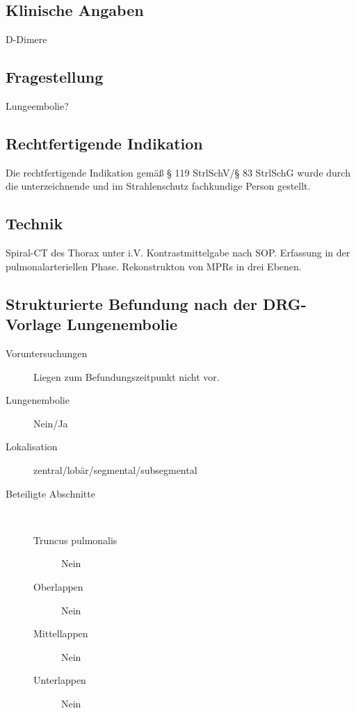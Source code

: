 \documentclass{scrartcl}
\begin{document}
\begin{letter}{\addressee{}}
  \opening{}

  \subsection*{Klinische Angaben}
  \begin{description}
  \item[D-Dimere]
  \end{description}

  \subsection*{Fragestellung}
  Lungeembolie?

  \subsection*{Rechtfertigende Indikation}
  Die rechtfertigende Indikation gemäß § 119 StrlSchV/§ 83 StrlSchG wurde durch die unterzeichnende und im Strahlenschutz fachkundige Person gestellt.

  \subsection*{Technik}
  Spiral-CT des Thorax unter i.V. Kontrastmittelgabe nach SOP. Erfassung in der pulmonalarteriellen Phase. Rekonstrukton von MPRs in drei Ebenen.

  \subsection*{Strukturierte Befundung nach der DRG-Vorlage Lungenembolie}
  \begin{description}
    
  \item[Voruntersuchungen] Liegen zum Befundungszeitpunkt nicht vor.
  \item[Lungenembolie] Nein/Ja
  \item[Lokalisation]zentral/lobär/segmental/subsegmental

  \item[Beteiligte Abschnitte] \ 
    \begin{description}
    \item[Truncus pulmonalis] Nein
    \item[Oberlappen] Nein
    \item[Mittellappen] Nein
    \item[Unterlappen] Nein
    \end{description}


\end{description}
\end{letter}
\end{document}

